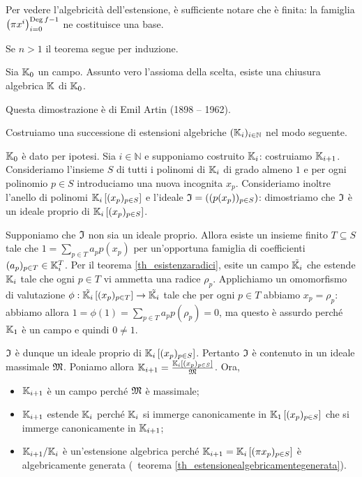 \par Per vedere l'algebricit\`a dell'estensione, \`e sufficiente notare che \`e finita: la famiglia $\left ( \Projection{x^i} \right )_{i = 0}^{\Deg f - 1}$ ne costituisce una base.
\par Se $n > 1$ il teorema segue per induzione. \EndProof
\begin{Theorem}
	Sia $\mathbb{K}_0$ un campo. Assunto vero l'assioma della scelta, esiste una chiusura algebrica $\mathbb{K}$ di $\mathbb{K}_0$.
\end{Theorem}
\Proof Questa dimostrazione \`e di Emil Artin (1898 -- 1962).
\par Costruiamo una successione di estensioni algebriche $(\mathbb{K}_i)_{i \in \mathbb{N}}$ nel modo seguente.
\par $\mathbb{K}_0$ \`e dato per ipotesi. Sia $i \in \mathbb{N}$ e supponiamo costruito $\mathbb{K}_i$: costruiamo $\mathbb{K}_{i + 1}$. Consideriamo l'insieme $S$ di tutti i polinomi di $\mathbb{K}_i$ di grado almeno $1$ e per ogni polinomio $p \in S$ introduciamo una nuova incognita $x_p$. Consideriamo inoltre l'anello di polinomi $\mathbb{K}_i \left [ (x_p)_{p \in S} \right ]$ e l'ideale $\mathfrak{I} = \left ( (p(x_p))_{p \in S} \right )$: dimostriamo che $\mathfrak{I}$ \`e un ideale proprio di $\mathbb{K}_i \left [ (x_p)_{p \in S} \right ]$.
\par Supponiamo che $\mathfrak{I}$ non sia un ideale proprio. Allora esiste un insieme finito $T \subseteq S$ tale che $1 = \sum_{p \in T} a_p p(x_p)$ per un'opportuna famiglia di coefficienti $(a_p)_{p \in T} \in \mathbb{K}_i^T$. Per il teorema \ref{th_esistenzaradici}, esite un campo $\tilde{\mathbb{K}_i}$ che estende $\mathbb{K}_i$ tale che ogni $p \in T$ vi ammetta una radice $\rho_p$. Applichiamo un omomorfismo di valutazione $\phi: \tilde{\mathbb{K}_i} \left [ (x_p)_{p \in T} \right ] \rightarrow \tilde{\mathbb{K}_i}$ tale che per ogni $p \in T$ abbiamo $x_p = \rho_p$: abbiamo allora $1 = \phi(1) = \sum_{p \in T} a_p p(\rho_p) = 0$, ma questo \`e assurdo perch\'e $\mathbb{K}_1$ \`e un campo e quindi $0 \neq 1$.
\par $\mathfrak{I}$ \`e dunque un ideale proprio di $\mathbb{K}_i \left [ (x_p)_{p \in S} \right ]$. Pertanto $\mathfrak{I}$ \`e contenuto in un ideale massimale $\mathfrak{M}$. Poniamo allora $\mathbb{K}_{i + 1} = \frac{\mathbb{K}_i \left [ (x_p)_{p \in S} \right ]}{\mathfrak{M}}$. Ora,
\begin{itemize}
	\item $\mathbb{K}_{i + 1}$ \`e un campo perch\'e $\mathfrak{M}$ \`e massimale;
	\item $\mathbb{K}_{i + 1}$ estende $\mathbb{K}_i$ perch\'e $\mathbb{K}_i$ si immerge canonicamente in $\mathbb{K}_1 \left [ (x_p)_{p \in S} \right ]$ che si immerge canonicamente in $\mathbb{K}_{i + 1}$;
	\item $\mathbb{K}_{i + 1}/\mathbb{K}_i$ \`e un'estensione algebrica perch\'e $\Field_{i + 1} = \RingAdjunction{\Field_i}{(\Projection{x_p})_{p \in S}}$ \`e algebricamente generata (\Cfr\ teorema \ref{th_estensionealgebricamentegenerata}).
\end{itemize}
